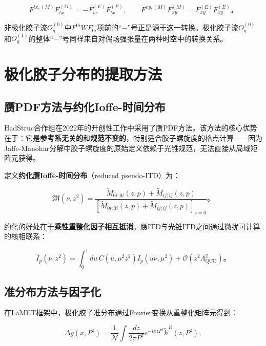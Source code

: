 \documentclass[12pt,a4paper]{ctexart}
\theoremstyle{definition}
\begin{document}
\begin{equation}
F^{tx,(M)}F^{(M)}_{tx} = -F^{(E)}_{tx}F^{(E)}_{tx}, \qquad
F^{xy,(M)}F^{(M)}_{xy} = F^{(E)}_{xy}F^{(E)}_{xy}。
\label{eq:ME_conversion}
\end{equation}

非极化胶子流$O^{(0)}_g$中$F^{0i}W F_{0i}$项前的``$-$''号正是源于这一转换。极化胶子流$O^{(0)}_g$和$O^{(1)}_g$的整体``$-$''号同样来自对偶场强张量在两种时空中的转换关系。

\section{极化胶子分布的提取方法}

\subsection{赝PDF方法与约化Ioffe-时间分布}

HadStruc合作组在2022年的开创性工作\cite{Egerer2022}中采用了赝PDF方法。该方法的核心优势在于：它是\textbf{参考系无关的}和\textbf{规范不变的}，特别适合胶子螺旋度的格点计算——因为Jaffe-Manohar分解中胶子螺旋度的原始定义依赖于光锥规范，无法直接从局域矩阵元获得。

定义\textbf{约化赝Ioffe-时间分布}（reduced pseudo-ITD）为\cite{Egerer2022}：

\begin{equation}
\mathfrak{M}(\nu, z^2) = \frac{\tilde{M}_{0i;0i}(z,p) + \tilde{M}_{ij;ij}(z,p)}{[\tilde{M}_{0i;0i}(z,p) + \tilde{M}_{ij;ij}(z,p)]_{z=0}}。
\label{eq:reduced_ITD}
\end{equation}

约化的好处在于\textbf{乘性重整化因子相互抵消}\cite{Egerer2022}。赝ITD与光锥ITD之间通过微扰可计算的核相联系：

\begin{equation}
\tilde{I}_p(\nu, z^2) = \int_0^1 du\, C(u, \mu^2 z^2) I_p(u\nu, \mu^2) + \mathcal{O}(z^2\Lambda_{\text{QCD}}^2)。
\label{eq:pseudo_factorization}
\end{equation}

\subsection{准分布方法与因子化}

在LaMET框架中，极化胶子准分布通过Fourier变换从重整化矩阵元得到\cite{Ji2017More}：

\begin{equation}
\Delta\tilde{g}(x, P^z) = \frac{1}{\mathcal{N}} \int \frac{dz}{2\pi P^z} e^{-ixzP^z} \tilde{h}^R(z, P^z),
\label{eq:quasi_Deltag}
\end{equation}
\end{document}
